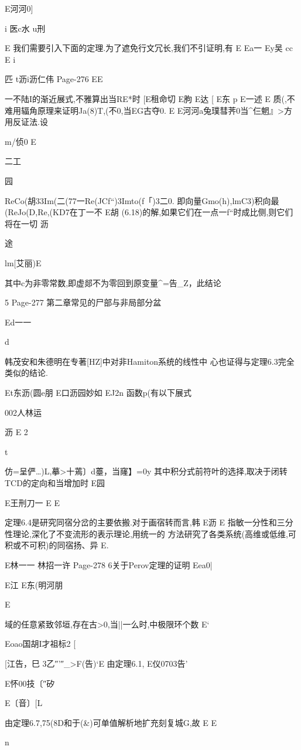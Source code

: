 {{{{{{{{{{{{{{E河河0]

i
医c水
u刑

E
我们需要引入下面的定理.为了遮免行文冗长,我们不引证明,有
E
Ea一
Ey吴
cc
E
i

匹
t沥i沥仁伟
Page-276
EE

一不陆I的渐近展式,不雅算出当RE*时
[E租命切
E朐
E达
[
E东
p
E一述
E
质(,不难用辐角原理来证明Ja(8)T,(不0,当EG古夺0.
E
E河河a兔璞彗荠0当^仨魍』>方
用反证法.设

m/侦0
E

二工

园

ReCo(胡33Im(二(77一Re(JCf“)3Imto(f「)3二0.
即向量Gmo(h),lmC3)积向最(ReJo(D,Re,(KD7在丁一不
E胡
(6.18)的解,如果它们在一点一f“时成比侧,则它们将在一切
沥

途

lm[艾丽)E

其中c为非零常数,即虚郯不为零回到原变量^=告_Z，此结论

5
Page-277
第二章常见的尸部与非局部分盆

Ed一一

d

韩茂安和朱德明在专著[HZ]中对非Hamiton系统的线性中
心也证得与定理6.3完全类似的结论.

Et东沥(圆e朋
E口沥园妙如
EJ2n
函数p(有以下展式

002人林运

沥
E
2

t

仿=呈俨…)L,摹>十蔫〕d薹，当窿】=0y
其中积分式前符叶的选择,取决于闭转TCD的定向和当增加时
E园

E王刑刀一
E
E

定理6.4是研究同宿分岔的主要依搬.对于画宿转而言,韩
E沥
E
指敏一分性和三分性理论,深化了不变流形的表示理论,用统一的
方法研究了各类系统(高维或低维,可积或不可积)的同宿扬、异
E.

E林一一
林招一许
Page-278
6关于Perov定理的证明
Eea0|

E江
E东(明河朋

E

域的任意紧致邻垣,存在古>0,当||一么时,中极限环个数
E`

Eoao国胡I才祖标2
[

[江告，巳
3乙″'″_>F(告)`E
由定理6.1,
E仪0703告'

E怀00技〔″矽

E〔音〕[L

由定理6.7,75(8D和于(&)可单值解析地扩充刻复城G,故
E
E

n

}}}}}}}}}}}}}}
